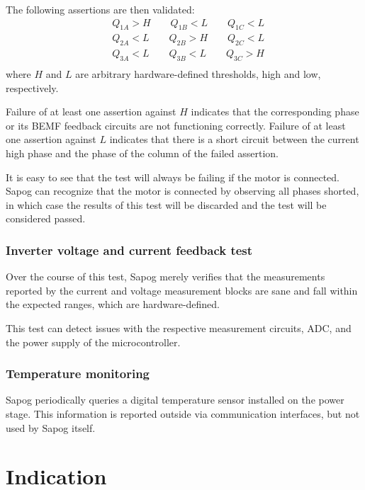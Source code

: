 \documentclass{zubaxdoc}
\begin{document}
The following assertions are then validated:
\begin{equation}
\begin{aligned}
&Q_{1A} > H \qquad{} Q_{1B} < L \qquad{} Q_{1C} < L \\
&Q_{2A} < L \qquad{} Q_{2B} > H \qquad{} Q_{2C} < L \\
&Q_{3A} < L \qquad{} Q_{3B} < L \qquad{} Q_{3C} > H \\
\end{aligned}
\end{equation}
where $H$ and $L$ are arbitrary hardware-defined thresholds, high and low, respectively.

Failure of at least one assertion against $H$ indicates that the corresponding phase
or its BEMF feedback circuits are not functioning correctly.
Failure of at least one assertion against $L$ indicates that there is a short circuit between
the current high phase and the phase of the column of the failed assertion.

It is easy to see that the test will always be failing if the motor is connected.
Sapog can recognize that the motor is connected by observing all phases shorted,
in which case the results of this test will be discarded and the test will be considered passed.

\subsection{Inverter voltage and current feedback test}

Over the course of this test, Sapog merely verifies that the measurements reported by the
current and voltage measurement blocks are sane and fall within the expected ranges,
which are hardware-defined.

This test can detect issues with the respective measurement circuits,
ADC, and the power supply of the microcontroller.

\subsection{Temperature monitoring}

Sapog periodically queries a digital temperature sensor installed on the power stage.
This information is reported outside via communication interfaces, but not used
by Sapog itself.

\chapter{Indication}\label{sec:indication}
\end{document}
